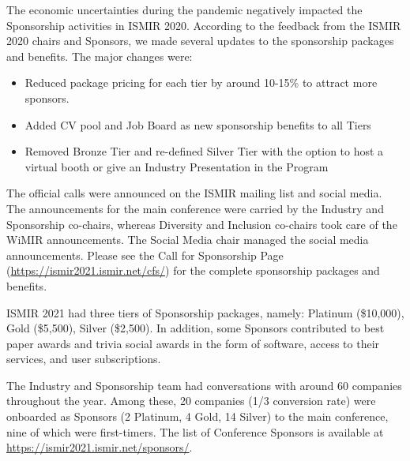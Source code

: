 \documentclass[%
10pt,								%
]
{scrartcl}
\begin{document}
        The economic uncertainties during the pandemic negatively impacted the Sponsorship activities in ISMIR 2020. According to the feedback from the ISMIR 2020 chairs and Sponsors, we made several updates to the sponsorship packages and benefits. The major changes were:
        \begin{itemize}
            \item Reduced package pricing for each tier by around 10-15\% to attract more sponsors. 
            \item Added CV pool and Job Board as new sponsorship benefits to all Tiers
            \item Removed Bronze Tier and re-defined Silver Tier with the option to host a virtual booth or give an Industry Presentation in the Program

        \end{itemize}
        The official calls were announced on the ISMIR mailing list and social media. The announcements for the main conference were carried by the Industry and Sponsorship co-chairs, whereas Diversity and Inclusion co-chairs took care of the WiMIR announcements. The Social Media chair managed the social media announcements. Please see the Call for Sponsorship Page (\href{https://ismir2021.ismir.net/cfs/}{https://ismir2021.ismir.net/cfs/}) for the complete sponsorship packages and benefits. 
        
        ISMIR 2021 had three tiers of Sponsorship packages, namely: Platinum (\$10,000), Gold (\$5,500), Silver (\$2,500). In addition, some Sponsors contributed to best paper awards and trivia social awards in the form of software, access to their services, and user subscriptions.
        
        The Industry and Sponsorship team had conversations with around 60 companies throughout the year. Among these, 20 companies (1/3 conversion rate) were onboarded as Sponsors (2 Platinum, 4 Gold, 14 Silver) to the main conference, nine of which were first-timers. The list of Conference Sponsors is available at \href{https://ismir2021.ismir.net/sponsors/}{https://ismir2021.ismir.net/sponsors/}. 
        
\end{document}
